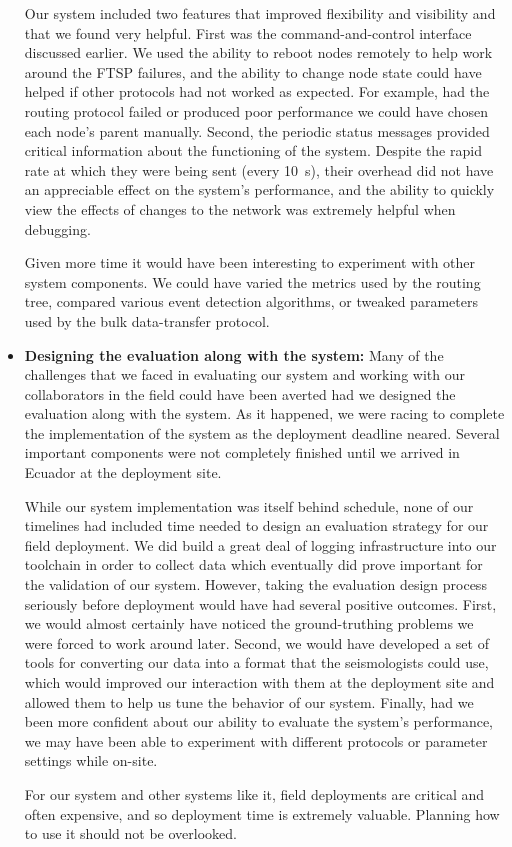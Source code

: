 \begin{itemize}
\hspace{0.25in} Our system included two features that improved flexibility
and visibility and that we found very helpful. First was the
command-and-control interface discussed earlier. We used the ability to
reboot nodes remotely to help work around the FTSP failures, and the ability
to change node state could have helped if other protocols had not worked as
expected. For example, had the routing protocol failed or produced poor
performance we could have chosen each node's parent manually. Second, the
periodic status messages provided critical information about the functioning
of the system. Despite the rapid rate at which they were being sent (every
10~s), their overhead did not have an appreciable effect on the system's
performance, and the ability to quickly view the effects of changes to the
network was extremely helpful when debugging.

\hspace{0.25in} Given more time it would have been interesting to experiment
with other system components. We could have varied the metrics used by the
routing tree, compared various event detection algorithms, or tweaked
parameters used by the bulk data-transfer protocol.

\item \textbf{Designing the evaluation along with the system:} Many of the
challenges that we faced in evaluating our system and working with our
collaborators in the field could have been averted had we designed the
evaluation along with the system. As it happened, we were racing to complete
the implementation of the system as the deployment deadline neared. Several
important components were not completely finished until we arrived in Ecuador
at the deployment site.

\hspace{0.25in} While our system implementation was itself behind schedule,
none of our timelines had included time needed to design an evaluation
strategy for our field deployment. We did build a great deal of logging
infrastructure into our toolchain in order to collect data which eventually
did prove important for the validation of our system. However, taking the
evaluation design process seriously before deployment would have had several
positive outcomes. First, we would almost certainly have noticed the
ground-truthing problems we were forced to work around later. Second, we
would have developed a set of tools for converting our data into a format
that the seismologists could use, which would improved our interaction with
them at the deployment site and allowed them to help us tune the behavior of
our system. Finally, had we been more confident about our ability to evaluate
the system's performance, we may have been able to experiment with different
protocols or parameter settings while on-site.

\hspace{0.25in} For our system and other systems like it, field deployments
are critical and often expensive, and so deployment time is extremely
valuable. Planning how to use it should not be overlooked.

\end{itemize}

